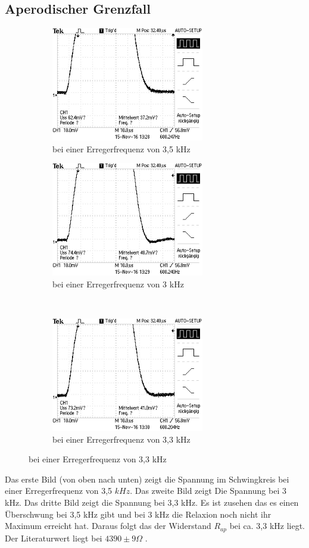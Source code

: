   \subsection{Aperodischer Grenzfall}
  \begin{figure}
    \centering
    \caption{Spannungen im Schwingkreis}
    \begin{subfigure}{0.48\textwidth}
      \includegraphics[height= 5cm]{./logos/5Print.JPG}
      \caption{bei einer Erregerfrequenz von 3,5 kHz}
      \label{fig:p1}
    \end{subfigure}
    \begin{subfigure}{0.48\textwidth}
      \includegraphics[height= 5cm]{./logos/6Print.JPG}
      \caption{bei einer Erregerfrequenz von 3 kHz}
      \label{fig:p2}
    \end{subfigure}
    \\
    \begin{subfigure}{0.48\textwidth}
      \includegraphics[height= 5cm]{./logos/7Print.JPG}
      \caption{bei einer Erregerfrequenz von 3,3 kHz}
      \label{fig:p3}
    \end{subfigure}
      \label{fig:prints}
  \end{figure}
  \FloatBarrier
      Das erste Bild (von oben nach unten) zeigt die Spannung im Schwingkreis
      bei einer Erregerfrequenz von 3,5 $kHz$.
      Das zweite Bild zeigt Die Spannung bei 3 kHz. Das dritte Bild zeigt die
      Spannung bei 3,3 kHz. Es ist zusehen das es einen Überschwung bei 3,5 kHz
      gibt und bei 3 kHz die Relaxion noch nicht
      ihr Maximum erreicht hat. Daraus folgt das der Widerstand $R_{ap}$ bei ca.
      3,3 kHz liegt. Der Literaturwert liegt bei
      $4390 \pm 9 \Omega$ .

